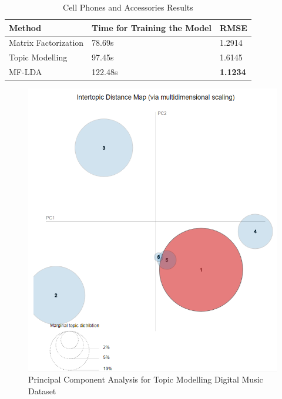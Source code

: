 \documentclass[10pt,conference]{IEEEtran}
\begin{document}
\begin{table}[h]
\centering
\caption{Cell Phones and Accessories Results}\label{Cell Phones and Accessories Results}
\renewcommand{\arraystretch}{1.3}
\begin{tabular}{ lll }
\toprule
\textbf{Method} & \textbf{Time for Training the Model} & \textbf{RMSE} \\
\toprule
Matrix Factorization & 78.69s & 1.2914 \\
\hline
Topic Modelling & 97.45s & 1.6145 \\
\hline
MF-LDA & 122.48s  & \textbf{1.1234} \\ 
\bottomrule        
\end{tabular}
\end{table}


\begin{figure}[t]
  \includegraphics[width=\linewidth]{img/lda/1.PNG}
  \caption{Principal Component Analysis for Topic Modelling Digital Music Dataset}
  \label{fig:1}
\endminipage\hfill
{}

\end{figure}
\end{document}

